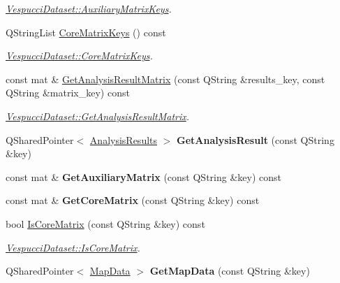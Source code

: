 \begin{DoxyCompactItemize}
\begin{DoxyCompactList}\small\item\em \hyperlink{class_vespucci_dataset_ade1b203a4057345971c5949b804bf039}{Vespucci\+Dataset\+::\+Auxiliary\+Matrix\+Keys}. \end{DoxyCompactList}\item 
Q\+String\+List \hyperlink{class_vespucci_dataset_a8a87777ec5e9047bb1433566ea5ee193}{Core\+Matrix\+Keys} () const 
\begin{DoxyCompactList}\small\item\em \hyperlink{class_vespucci_dataset_a8a87777ec5e9047bb1433566ea5ee193}{Vespucci\+Dataset\+::\+Core\+Matrix\+Keys}. \end{DoxyCompactList}\item 
const mat \& \hyperlink{class_vespucci_dataset_aa4c369a7b0cbd31ac051ad68e3bee60d}{Get\+Analysis\+Result\+Matrix} (const Q\+String \&results\+\_\+key, const Q\+String \&matrix\+\_\+key) const 
\begin{DoxyCompactList}\small\item\em \hyperlink{class_vespucci_dataset_aa4c369a7b0cbd31ac051ad68e3bee60d}{Vespucci\+Dataset\+::\+Get\+Analysis\+Result\+Matrix}. \end{DoxyCompactList}\item 
Q\+Shared\+Pointer$<$ \hyperlink{class_analysis_results}{Analysis\+Results} $>$ {\bfseries Get\+Analysis\+Result} (const Q\+String \&key)\hypertarget{class_vespucci_dataset_a752b0204411deb2286c7b672f6b2dced}{}\label{class_vespucci_dataset_a752b0204411deb2286c7b672f6b2dced}

\item 
const mat \& {\bfseries Get\+Auxiliary\+Matrix} (const Q\+String \&key) const \hypertarget{class_vespucci_dataset_adab05fb73502bed29e7ef16b9cca00e7}{}\label{class_vespucci_dataset_adab05fb73502bed29e7ef16b9cca00e7}

\item 
const mat \& {\bfseries Get\+Core\+Matrix} (const Q\+String \&key) const \hypertarget{class_vespucci_dataset_a8afaa849808f5725c3029c147b75c800}{}\label{class_vespucci_dataset_a8afaa849808f5725c3029c147b75c800}

\item 
bool \hyperlink{class_vespucci_dataset_a26c1cd04f6d5ef3abdc259606292df12}{Is\+Core\+Matrix} (const Q\+String \&key) const 
\begin{DoxyCompactList}\small\item\em \hyperlink{class_vespucci_dataset_a26c1cd04f6d5ef3abdc259606292df12}{Vespucci\+Dataset\+::\+Is\+Core\+Matrix}. \end{DoxyCompactList}\item 
Q\+Shared\+Pointer$<$ \hyperlink{class_map_data}{Map\+Data} $>$ {\bfseries Get\+Map\+Data} (const Q\+String \&key)\hypertarget{class_vespucci_dataset_aab545a84a58f9551b6ce50c12ab893dd}{}\label{class_vespucci_dataset_aab545a84a58f9551b6ce50c12ab893dd}


\end{DoxyCompactItemize}
